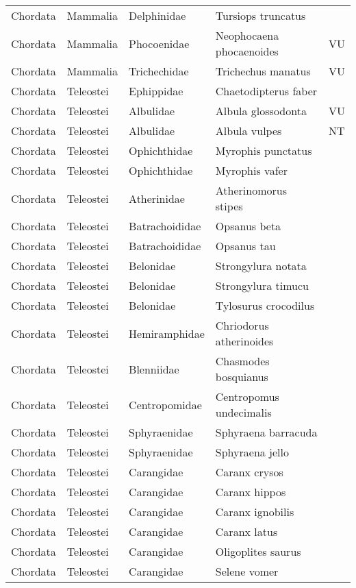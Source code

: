 \begin{longtable}{lllll}
  Chordata & Mammalia & Delphinidae & Tursiops truncatus &  \\ 
  Chordata & Mammalia & Phocoenidae & Neophocaena phocaenoides & VU \\ 
  Chordata & Mammalia & Trichechidae & Trichechus manatus & VU \\ 
  Chordata & Teleostei & Ephippidae & Chaetodipterus faber &  \\ 
  Chordata & Teleostei & Albulidae & Albula glossodonta & VU \\ 
  Chordata & Teleostei & Albulidae & Albula vulpes & NT \\ 
  Chordata & Teleostei & Ophichthidae & Myrophis punctatus &  \\ 
  Chordata & Teleostei & Ophichthidae & Myrophis vafer &  \\ 
  Chordata & Teleostei & Atherinidae & Atherinomorus stipes &  \\ 
  Chordata & Teleostei & Batrachoididae & Opsanus beta &  \\ 
  Chordata & Teleostei & Batrachoididae & Opsanus tau &  \\ 
  Chordata & Teleostei & Belonidae & Strongylura notata &  \\ 
  Chordata & Teleostei & Belonidae & Strongylura timucu &  \\ 
  Chordata & Teleostei & Belonidae & Tylosurus crocodilus &  \\ 
  Chordata & Teleostei & Hemiramphidae & Chriodorus atherinoides &  \\ 
  Chordata & Teleostei & Blenniidae & Chasmodes bosquianus &  \\ 
  Chordata & Teleostei & Centropomidae & Centropomus undecimalis &  \\ 
  Chordata & Teleostei & Sphyraenidae & Sphyraena barracuda &  \\ 
  Chordata & Teleostei & Sphyraenidae & Sphyraena jello &  \\ 
  Chordata & Teleostei & Carangidae & Caranx crysos &  \\ 
  Chordata & Teleostei & Carangidae & Caranx hippos &  \\ 
  Chordata & Teleostei & Carangidae & Caranx ignobilis &  \\ 
  Chordata & Teleostei & Carangidae & Caranx latus &  \\ 
  Chordata & Teleostei & Carangidae & Oligoplites saurus &  \\ 
  Chordata & Teleostei & Carangidae & Selene vomer &  \\ 

\end{longtable}

